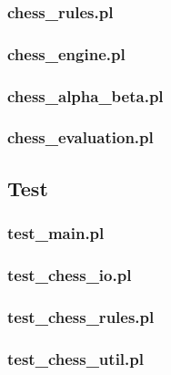 \documentclass[a4paper,10pt]{article}
\begin{document}
    \subsubsection{chess\_rules.pl}\label{chess_rules}
      
    \subsubsection{chess\_engine.pl}\label{chess_engine}
      
    \subsubsection{chess\_alpha\_beta.pl}\label{chess_alpha_beta}
      
    \subsubsection{chess\_evaluation.pl}\label{chess_evaluation}
      
  \subsection{Test}
    \subsubsection{test\_main.pl}\label{test_main}
        
    \subsubsection{test\_chess\_io.pl}\label{test_chess_io}
        
    \subsubsection{test\_chess\_rules.pl}\label{test_chess_rules}
        
    \subsubsection{test\_chess\_util.pl}\label{test_chess_util}
        
  \restoregeometry
\end{document}
